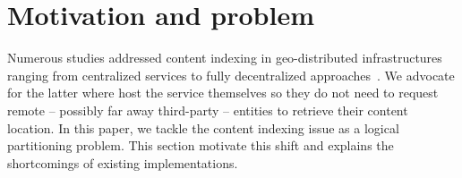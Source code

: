 \section{Motivation and problem}
\label{sec:background}

Numerous studies addressed content indexing in geo-distributed
infrastructures ranging from centralized services to fully
decentralized approaches~\REF. We advocate for the latter where
\processes host the service themselves so they do not need to request
remote -- possibly far away third-party -- entities to retrieve their
content location.  In this paper, we tackle the content indexing issue
as a logical partitioning problem. This section motivate this shift
and explains the shortcomings of existing implementations.


